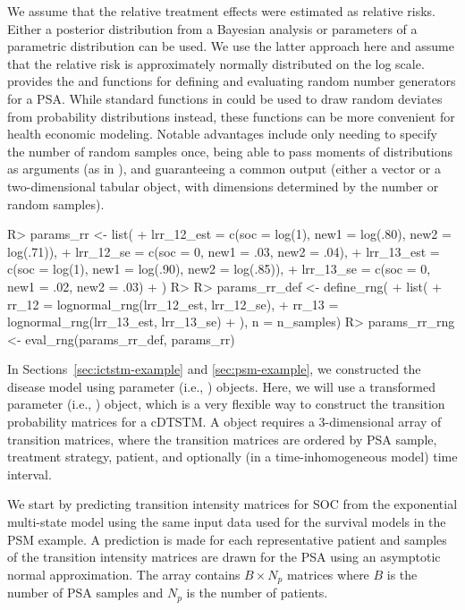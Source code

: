 \documentclass[article, nojss]{jss}\usepackage[]{graphicx}\usepackage[]{color}
\begin{document}
We assume that the relative treatment effects were estimated as relative risks. Either a posterior distribution from a Bayesian analysis or parameters of a parametric distribution can be used. We use the latter approach here and assume that the relative risk is approximately normally distributed on the log scale.  provides the  and  functions for defining and evaluating random number generators for a PSA. While standard functions in  could be used to draw random deviates from probability distributions instead, these functions can be more convenient for health economic modeling. Notable advantages include only needing to specify the number of random samples once, being able to pass moments of distributions as arguments (as in ), and guaranteeing a common output (either a vector or a two-dimensional tabular object, with dimensions determined by the number or random samples). 

\begin{Schunk}
\begin{Sinput}
R> params_rr <- list(
+    lrr_12_est = c(soc = log(1), new1 = log(.80), new2 = log(.71)),
+    lrr_12_se = c(soc = 0, new1 = .03, new2 = .04),
+    lrr_13_est = c(soc = log(1), new1 = log(.90), new2 = log(.85)),
+    lrr_13_se = c(soc = 0, new1 = .02, new2 = .03)
+  )  
R> 
R> params_rr_def <- define_rng({
+    list(
+      rr_12 = lognormal_rng(lrr_12_est, lrr_12_se),
+      rr_13 = lognormal_rng(lrr_13_est, lrr_13_se)
+    )}, n = n_samples)
R> params_rr_rng <- eval_rng(params_rr_def, params_rr)
\end{Sinput}
\end{Schunk}

In Sections~\ref{sec:ictstm-example} and \ref{sec:psm-example}, we constructed the disease model using parameter (i.e., ) objects. Here, we will use a transformed parameter (i.e., ) object, which is a very flexible way to construct the transition probability matrices for a cDTSTM. A  object requires a 3-dimensional array of transition matrices, where the transition matrices are ordered by PSA sample, treatment strategy, patient, and optionally (in a time-inhomogeneous model) time interval.

We start by predicting transition intensity matrices for SOC from the exponential multi-state model using the same input data used for the survival models in the PSM example. A prediction is made for each representative patient and samples of the transition intensity matrices are drawn for the PSA using an asymptotic normal approximation. The array contains $B \times N_p$ matrices where $B$ is the number of PSA samples and $N_p$ is the number of patients. 
\end{document}
